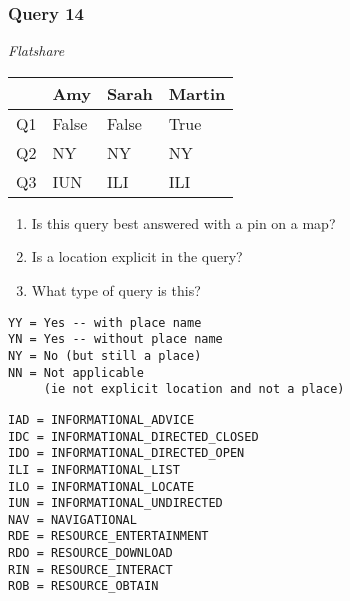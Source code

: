 \begin{frame}[fragile]
\frametitle{Query 14}
\vspace{1em}

\emph{Flatshare}

\vfill

\begin{table}
  \centering
  \begin{tabular}{ l l l l }
    & \textbf{Amy} & \textbf{Sarah} & \textbf{Martin}\\
    \toprule
    Q1 & False & False & True\\
Q2 & NY & NY & NY\\
Q3 & IUN & ILI & ILI\\
    \bottomrule
  \end{tabular}
\end{table}

\vfill

\tiny{

\begin{enumerate}
\item Is this query best answered with a pin on a map?
\item Is a location explicit in the query?
\item What type of query is this?
\end{enumerate}

\vfill

\begin{multicols}{2}
\begin{verbatim}
YY = Yes -- with place name
YN = Yes -- without place name
NY = No (but still a place)
NN = Not applicable 
     (ie not explicit location and not a place)
\end{verbatim}

\columnbreak
\begin{verbatim}
IAD = INFORMATIONAL_ADVICE
IDC = INFORMATIONAL_DIRECTED_CLOSED
IDO = INFORMATIONAL_DIRECTED_OPEN
ILI = INFORMATIONAL_LIST
ILO = INFORMATIONAL_LOCATE
IUN = INFORMATIONAL_UNDIRECTED
NAV = NAVIGATIONAL
RDE = RESOURCE_ENTERTAINMENT
RDO = RESOURCE_DOWNLOAD
RIN = RESOURCE_INTERACT
ROB = RESOURCE_OBTAIN
\end{verbatim}
\end{multicols}
}

\end{frame}


